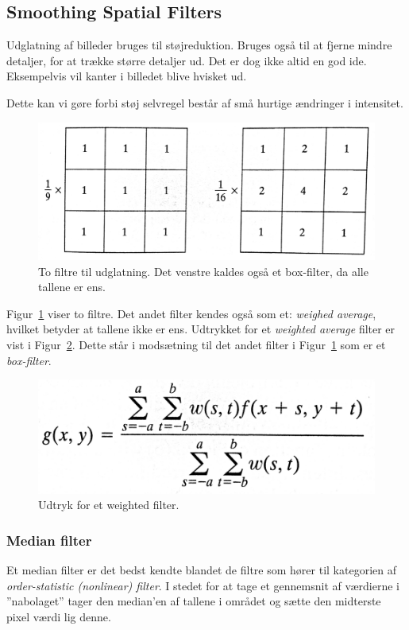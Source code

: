 \subsection{Smoothing Spatial Filters}
Udglatning af billeder bruges til støjreduktion. Bruges også til at fjerne mindre detaljer, for at trække større detaljer ud. Det er dog ikke altid en god ide. Eksempelvis vil kanter i billedet blive hvisket ud. 

Dette kan vi gøre forbi støj selvregel består af små hurtige ændringer i intensitet.

\begin{figure}[H]
	\centering
	\includegraphics[width=0.7\linewidth]{figs/spm02/smoothing-filter}
	\caption{To filtre til udglatning. Det venstre kaldes også et box-filter, da alle tallene er ens.}
	\label{fig:smoothing-filter}
\end{figure}

Figur~\ref{fig:smoothing-filter} viser to filtre. Det andet filter kendes også som et: \textit{weighed average}, hvilket betyder at tallene ikke er ens. Udtrykket for et \textit{weighted average} filter er vist i Figur~\ref{fig:weightedfiltereq}. Dette står i modsætning til det andet filter i Figur~\ref{fig:smoothing-filter} som er et \textit{box-filter}.

\begin{figure}[H]
	\centering
	\includegraphics[width=0.55\linewidth]{figs/spm02/weightedfiltereq}
	\caption{Udtryk for et weighted filter.}
	\label{fig:weightedfiltereq}
\end{figure}

\subsubsection{Median filter}
Et median filter er det bedst kendte blandet de filtre som hører til kategorien af \textit{order-statistic (nonlinear) filter}. I stedet for at tage et gennemsnit af værdierne i ''nabolaget'' tager den median'en af tallene i området og sætte den midterste pixel værdi lig denne.

